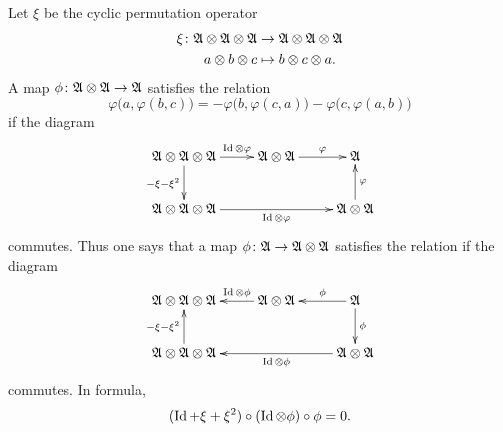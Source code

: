 Let \( \xi\) be the cyclic permutation operator
\begin{equation}
    \begin{aligned}
        \xi\colon \mathfrak{A}\otimes\mathfrak{A}\otimes\mathfrak{A}&\to \mathfrak{A}\otimes\mathfrak{A}\otimes\mathfrak{A} \\
        a\otimes b\otimes c&\mapsto b\otimes c\otimes a.
    \end{aligned}
\end{equation}
A map \( \phi\colon \mathfrak{A}\otimes\mathfrak{A}\to \mathfrak{A}\) satisfies the  relation
\begin{equation}
    \varphi\big( a,\varphi(b,c) \big)=-\varphi\big( b,\varphi(c,a) \big)-\varphi\big( c,\varphi(a,b) \big)
\end{equation}
if the diagram 
\begin{equation}
    \xymatrix{%
    \cA\otimes\cA\otimes\cA\ar[r]^-{\id\otimes\varphi}\ar[d]_{-\xi-\xi^2}   &   \cA\otimes\cA\ar[r]^-{\varphi}      &   \cA\\
    \cA\otimes\cA\otimes\cA\ar[rr]_-{\id\otimes\varphi} &   &   \cA\otimes\cA\ar[u]_-{\varphi}
       }
\end{equation}
commutes. Thus one says that a map \( \phi\colon \mathfrak{A}\to \mathfrak{A}\otimes\mathfrak{A}\) satisfies the  relation if the diagram
\begin{equation}
    \xymatrix{%
    \cA\otimes\cA\otimes\cA     &       \cA\otimes\cA\ar[l]_-{\id\otimes\phi}       &       \cA\ar[l]_-{\phi}\ar[d]^-{\phi}\\
    \cA\otimes\cA\otimes\cA\ar[u]^-{-\xi-\xi^2}     &                               &       \cA\otimes\cA\ar[ll]^-{\id\otimes\phi}
    }
\end{equation}
commutes. In formula,
\begin{equation}        \label{EqDefCoJacobi}
    (\operatorname{Id}+\xi+\xi^2)\circ(\operatorname{Id}\otimes\phi)\circ\phi=0.
\end{equation}
